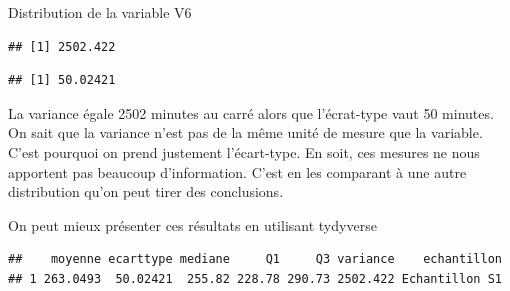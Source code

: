 \documentclass[ignorenonframetext,]{beamer}
\newenvironment{Shaded}{\begin{snugshade}}{\end{snugshade}}
\newcommand{\KeywordTok}[1]{\textcolor[rgb]{0.13,0.29,0.53}{\textbf{#1}}}
\newcommand{\DataTypeTok}[1]{\textcolor[rgb]{0.13,0.29,0.53}{#1}}
\newcommand{\FloatTok}[1]{\textcolor[rgb]{0.00,0.00,0.81}{#1}}
\newcommand{\StringTok}[1]{\textcolor[rgb]{0.31,0.60,0.02}{#1}}
\newcommand{\CommentTok}[1]{\textcolor[rgb]{0.56,0.35,0.01}{\textit{#1}}}
\newcommand{\OtherTok}[1]{\textcolor[rgb]{0.56,0.35,0.01}{#1}}
\newcommand{\OperatorTok}[1]{\textcolor[rgb]{0.81,0.36,0.00}{\textbf{#1}}}
\newcommand{\NormalTok}[1]{#1}
\begin{document}
\begin{frame}[fragile]{Distribution de la variable V6}
\begin{verbatim}
## [1] 2502.422
\end{verbatim}

\begin{Shaded}
\end{Shaded}

\begin{verbatim}
## [1] 50.02421
\end{verbatim}

La variance égale 2502 minutes au carré alors que l'écrat-type vaut 50
minutes. On sait que la variance n'est pas de la même unité de mesure
que la variable. C'est pourquoi on prend justement l'écart-type. En
soit, ces mesures ne nous apportent pas beaucoup d'information. C'est en
les comparant à une autre distribution qu'on peut tirer des conclusions.

On peut mieux présenter ces résultats en utilisant tydyverse

\begin{Shaded}
\end{Shaded}

\begin{verbatim}
##    moyenne ecarttype mediane     Q1     Q3 variance    echantillon
## 1 263.0493  50.02421  255.82 228.78 290.73 2502.422 Echantillon S1
\end{verbatim}

\end{frame}
\end{document}
